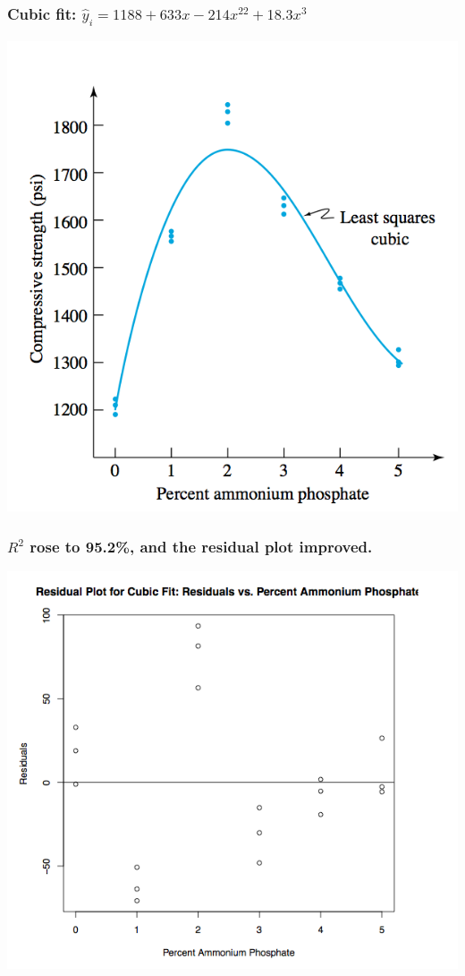 \documentclass[handout]{beamer}
\providecommand{\wh}[1]{\widehat{#1}}
\numberwithin{equation}{section}
\begin{document}
\begin{frame}
\frametitle{Cubic fit: $\wh{y}_i = 1188 + 633 x - 214 x^22 + 18.3 x^3$}
 \includegraphics{../../fig/flyashcubicfitfit.png}
\end{frame}

\begin{frame}
\frametitle{$R^2$ rose to 95.2\%, and the residual plot improved.}
 \includegraphics{../../fig/flyashcubicfitres.png}
\end{frame}
\end{document}
